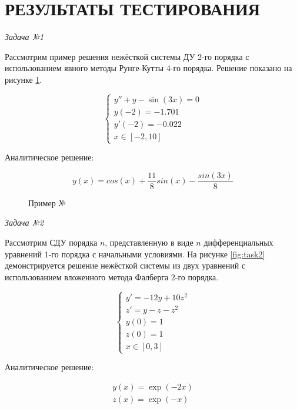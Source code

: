 \section{РЕЗУЛЬТАТЫ ТЕСТИРОВАНИЯ}

\textit{Задача №1}

Рассмотрим пример решения нежёсткой системы ДУ 2-го порядка с использованием явного методы Рунге-Кутты 4-го порядка. Решение показано
на рисунке \ref{fig:task1}.

\begin{equation}
    \begin{cases}
        y'' + y - \sin(3x) = 0\\
        y(-2) = -1.701\\
        y'(-2) = -0.022\\
        x \in [-2, 10]
    \end{cases}
    \label{eq:KoshiTask1}
\end{equation}

Аналитическое решение:

\begin{equation}
    y(x) = cos(x) + \dfrac{11}{8}sin(x) - \dfrac{sin(3x)}{8}
    \label{eq:Analitic1}
\end{equation}

\begin{figure}
    
    \caption{Пример №}
    \label{fig:task1}
\end{figure}

\textit{Задача №2}

Рассмотрим СДУ порядка $n$, представленную в виде $n$ дифференциальных уравнений 1-го порядка с начальными условиями. На
рисунке \ref{fig:task2} демонстрируется решение нежёсткой системы из двух уравнений с использованием вложенного метода Фалберга 2-го порядка.

\begin{equation}
    \begin{cases}
        y' = -12y + 10z^2\\
        z' = y - z - z^2\\
        y(0) = 1\\
        z(0) = 1\\
        x \in [0, 3]
    \end{cases}
    \label{eq:KoshiTask2}
\end{equation}

Аналитическое решение:

\begin{equation}
    \begin{gathered}
        y(x) = \exp(-2x)\\
        z(x) = \exp(-x)
    \end{gathered}
    \label{eq:Analitic2}
\end{equation}

